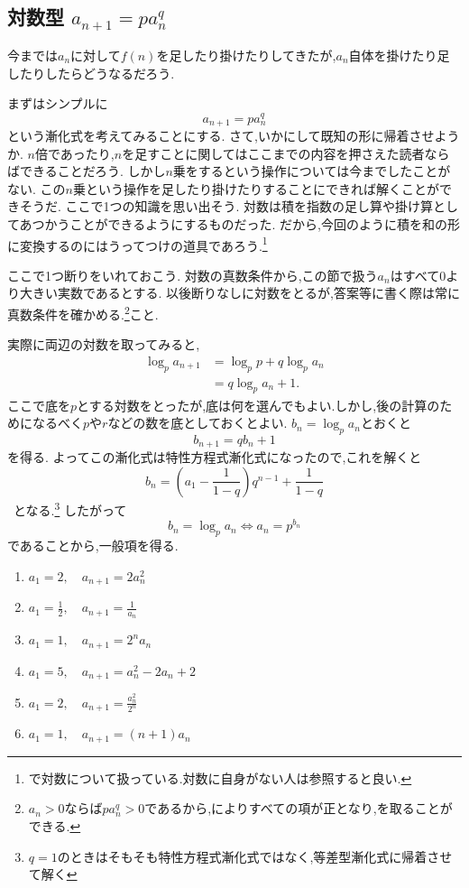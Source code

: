 
\subsection{\texorpdfstring{対数型  $a_{n+1}=pa_n^q$}{対数型}}\label{節：対数型}
  今までは$a_n$に対して$f(n)$を足したり掛けたりしてきたが,$a_n$自体を掛けたり足したりしたらどうなるだろう.

  まずはシンプルに
  \[
    a_{n+1}=pa_n^q
  \]
  という漸化式を考えてみることにする.
  さて,いかにして既知の形に帰着させようか.
  $n$倍であったり,$n$を足すことに関してはここまでの内容を押さえた読者ならばできることだろう.
  しかし$n$乗をするという操作については今までしたことがない.
  この$n$乗という操作を足したり掛けたりすることにできれば解くことができそうだ.
  ここで1つの知識を思い出そう.
  対数は積を指数の足し算や掛け算としてあつかうことができるようにするものだった.
  だから,今回のように積を和の形に変換するのにはうってつけの道具であろう.\footnote{ で対数について扱っている.対数に自身がない人は参照すると良い.}

  ここで1つ断りをいれておこう.
  対数の真数条件から,この節で扱う$a_n$はすべて0より大きい実数であるとする.
  以後断りなしに対数をとるが,答案等に書く際は常に真数条件を確かめる.\footnote{$a_n>0$ならば$p a_n^q>0$であるから,によりすべての項が正となり,を取ることができる.}こと.
  

  実際に両辺の対数を取ってみると,
  \begin{align*}
      \log_pa_{n+1}&=\log_pp+q\log_pa_n\\
      &=q\log_pa_n+1.
  \end{align*}
  ここで底を$p$とする対数をとったが,底は何を選んでもよい.しかし,後の計算のためになるべく$p$や$r$などの数を底としておくとよい.
  $b_n=\log_pa_n$とおくと
  \[
    b_{n+1}=qb_n+1
  \]
  を得る.
  よってこの漸化式は特性方程式漸化式になったので,これを解くと
  \[
    b_n=\left(a_1-\frac{1}{1-q}\right)q^{n-1}+\frac{1}{1-q}
  \]\
  となる.\footnote{$q=1$のときはそもそも特性方程式漸化式ではなく,等差型漸化式に帰着させて解く}
  したがって
  \[
    b_n=\log_p a_n  \iff a_n=p^{b_n}
  \]
  であることから,一般項を得る.
  
  \noindent{}\par\nobreak
  \begin{enumerate}[label=(\arabic*),parsep=3pt,format=\bookitemlink{example-logarithmic-1}{problem}{answer}]
    \item $\displaystyle a_1=2,\quad a_{n+1}=2a_n^2$
    \item $\displaystyle a_1=\frac{1}{2},\quad a_{n+1}=\frac{1}{a_n}$
    \item $\displaystyle a_1=1,\quad a_{n+1}=2^na_n$
    \item $\displaystyle a_1=5,\quad a_{n+1}=a_n^2-2a_n+2$
    \item $\displaystyle a_1=2,\quad a_{n+1}=\frac{a_n^2}{2^n}$
    \item $\displaystyle a_1=1,\quad a_{n+1}=(n+1)a_n$
  \end{enumerate}
  
